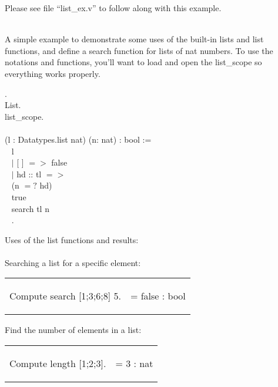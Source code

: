 
Please see file ``list\_ex.v'' to follow along with this example. 

~\\
A simple example to demonstrate some uses of the built-in lists and list functions, and define a search function for lists of nat numbers. To use the notations and functions, you'll want to load  and open the list\_scope so everything works properly.

\begin{code}
	 .				\\
	 List. 							\\
	 list\_scope.					\\
	\\
	\Fixpoint {} (l : Datatypes.list nat) (n: nat) : bool :=  	\\ \-\ \quad
	  \match l \with 								\\ \-\ \qquad
	   $\mid$ [ ] $=>$ false						\\ \-\ \qquad
	   $\mid$ hd :: tl $=>$ 						\\ \-\ \qquad\qquad
	      \If (n $=?$ hd)							\\ \-\ \qquad\qquad
	      \Then true								\\ \-\ \qquad\qquad
	      \Else search tl n							\\ \-\ \quad
	  \End.									
\end{code}

\noindent
Uses of the list functions and results:
\\~\\
Searching a list for a specific element:
	  
\hspace{-1cm}
\begin{tabular}{p{8cm} p{8cm}}
\begin{code}	Compute search [1;3;6;8] 5.		\end{code}	
&
\begin{msg}	= false     : bool					\end{msg}
\end{tabular}

\noindent	
Find the number of elements in a list:

\hspace{-1cm}
\begin{tabular}{p{8cm} p{8cm}}
\begin{code}	Compute length [1;2;3].			\end{code}
&
\begin{msg}	= 3     : nat					\end{msg}
\end{tabular}

